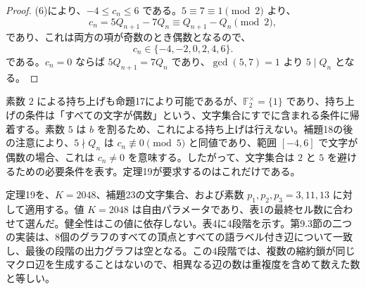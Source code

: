 \documentclass[11pt,reqno]{amsart}
\theoremstyle{definition}
\theoremstyle{definition}
\theoremstyle{remark}
\begin{document}
\begin{proof}\leavevmode\label{proof:23}
(6)により、\(-4\le c_n\le6\) である。\(5\equiv7\equiv1\pmod2\) より、
\[
c_n=5Q_{n+1}-7Q_n\equiv Q_{n+1}-Q_n\pmod2,
\]
であり、これは両方の項が奇数のとき偶数となるので、
\[
c_n\in\{-4,-2,0,2,4,6\}.
\]
である。\(c_n=0\) ならば \(5Q_{n+1}=7Q_n\) であり、\(\gcd(5,7)=1\) より \(5\mid Q_n\) となる。\qedhere
\end{proof}

素数 \(2\) による持ち上げも命題17により可能であるが、\(\mathbb F_2^\times=\{1\}\) であり、持ち上げの条件は「すべての文字が偶数」という、文字集合にすでに含まれる条件に帰着する。素数 \(5\) は \(b\) を割るため、これによる持ち上げは行えない。補題18の後の注意により、\(5\nmid Q_n\) は \(c_n\not\equiv0\pmod5\) と同値であり、範囲 \([-4,6]\) で文字が偶数の場合、これは \(c_n\ne0\) を意味する。したがって、文字集合は \(2\) と \(5\) を避けるための必要条件を表す。定理19が要求するのはこれだけである。

定理19を、\(K=2048\)、補題23の文字集合、および素数 \(p_1,p_2,p_3=3,11,13\) に対して適用する。値 \(K=2048\) は自由パラメータであり、表1の最終セル数に合わせて選んだ。健全性はこの値に依存しない。表4に4段階を示す。第9.3節の二つの実装は、8個のグラフのすべての頂点とすべての語ラベル付き辺について一致し、最後の段階の出力グラフは空となる。この4段階では、複数の縮約鎖が同じマクロ辺を生成することはないので、相異なる辺の数は重複度を含めて数えた数と等しい。

\end{document}
